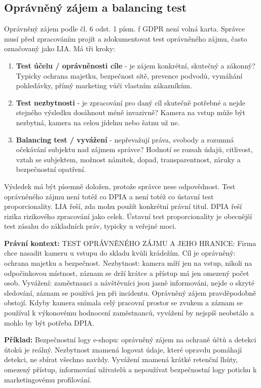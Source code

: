 \documentclass[11pt,a4paper]{article}
\newcommand{\priklad}[1]{\begin{tcolorbox}[breakable,enhanced,colback=green!7,colframe=green!30!black,boxrule=0pt,arc=1mm,left=5pt,right=5pt,top=5pt,bottom=5pt,before skip=6pt,after skip=6pt]\textbf{Příklad:} #1\end{tcolorbox}}
\newcommand{\pravobox}[1]{\begin{tcolorbox}[breakable,enhanced,colback=yellow!18,colframe=yellow!45!black,boxrule=0pt,arc=1mm,left=5pt,right=5pt,top=5pt,bottom=5pt,before skip=6pt,after skip=6pt]\textbf{Právní kontext:} #1\end{tcolorbox}}
\begin{document}
\subsection*{Oprávněný zájem a balancing test}
Oprávněný zájem podle čl. 6 odst. 1 písm. f GDPR není volná karta. Správce musí před zpracováním projít a zdokumentovat test oprávněného zájmu, často označovaný jako LIA. Má tři kroky:
\begin{enumerate}
  \item \textbf{Test účelu / oprávněnosti cíle} - je zájem konkrétní, skutečný a zákonný? Typicky ochrana majetku, bezpečnost sítě, prevence podvodů, vymáhání pohledávky, přímý marketing vůči vlastním zákazníkům.
  \item \textbf{Test nezbytnosti} - je zpracování pro daný cíl skutečně potřebné a nejde stejného výsledku dosáhnout méně invazivně? Kamera na vstup může být nezbytná, kamera na celou jídelnu nebo šatnu už ne.
  \item \textbf{Balancing test / vyvážení} - nepřevažují práva, svobody a rozumná očekávání subjektu nad zájmem správce? Hodnotí se rozsah údajů, citlivost, vztah se subjektem, možnost námitek, dopad, transparentnost, záruky a bezpečnostní opatření.
\end{enumerate}

Výsledek má být písemně doložen, protože správce nese odpovědnost. Test oprávněného zájmu není totéž co DPIA a není totéž co ústavní test proporcionality. LIA řeší, zda mohu použít konkrétní právní titul. DPIA řeší rizika rizikového zpracování jako celek. Ústavní test proporcionality je obecnější test zásahu do základních práv, typicky u veřejné moci.

\pravobox{TEST OPRÁVNĚNÉHO ZÁJMU A JEHO HRANICE: Firma chce nasadit kameru u vstupu do skladu kvůli krádežím. Cíl je oprávněný: ochrana majetku a bezpečnost. Nezbytnost: kamera míří jen na vstup, nikoli na odpočinkovou místnost, záznam se drží krátce a přístup má jen omezený počet osob. Vyvážení: zaměstnanci a návštěvníci jsou jasně informováni, nejde o skryté sledování, záznam se používá jen při incidentu. Oprávněný zájem pravděpodobně obstojí. Kdyby kamera snímala celý pracovní prostor se zvukem a záznam se používal k výkonovému hodnocení zaměstnanců, vyvážení by nejspíš neobstálo a mohlo by být potřeba DPIA.}

\priklad{Bezpečnostní logy e-shopu: oprávněný zájem na ochraně účtů a detekci útoků je reálný. Nezbytnost znamená logovat údaje, které opravdu pomáhají detekci, ne sbírat všechno navždy. Vyvážení znamená krátké retenční lhůty, omezený přístup, informování uživatelů a nepoužívat bezpečnostní logy potichu k marketingovému profilování.}
\end{document}
